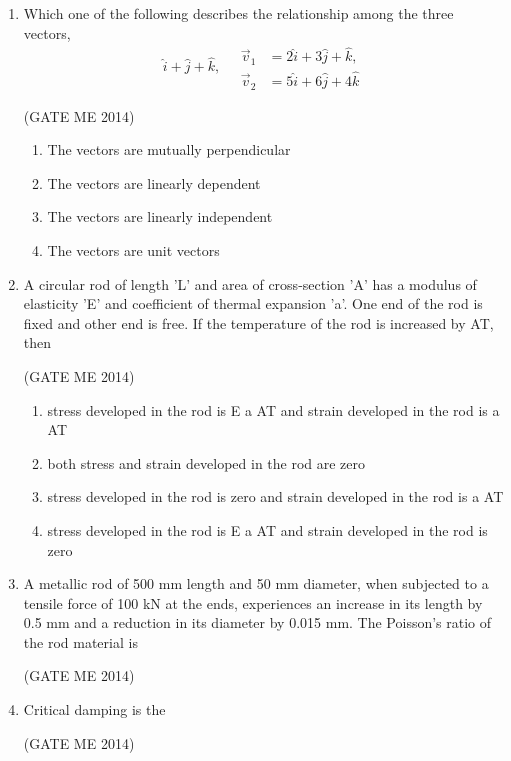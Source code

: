 \documentclass[journal]{IEEEtran}
\numberwithin{equation}{enumi}
\numberwithin{figure}{enumi}
\begin{document}
\begin{enumerate}
\item 
Which one of the following describes the relationship among the three vectors, 
\[
\hat{i} + \hat{j} + \hat{k}, \quad
\begin{aligned}
\vec{v}_1 &= 2\hat{i} + 3\hat{j} + \hat{k}, \\
\vec{v}_2 &= 5\hat{i} + 6\hat{j} + 4\hat{k}
\end{aligned}
\]

\hfill{(GATE ME 2014)}

\begin{enumerate}
    \item The vectors are mutually perpendicular
    \item The vectors are linearly dependent
    \item The vectors are linearly independent
    \item The vectors are unit vectors
\end{enumerate}
\item A circular rod of length 'L' and area of cross-section 'A' has a modulus of elasticity 'E' and
coefficient of thermal expansion 'a'. One end of the rod is fixed and other end is free. If the
temperature of the rod is increased by AT, then

\hfill{(GATE ME 2014)}

\begin{enumerate}
    
\item  stress developed in the rod is E a AT and strain developed in the rod is a AT
\item  both stress and strain developed in the rod are zero
\item  stress developed in the rod is zero and strain developed in the rod is a AT
\item  stress developed in the rod is E a AT and strain developed in the rod is zero

\end{enumerate}

\item A metallic rod of 500 mm length and 50 mm diameter, when subjected to a tensile force of 100 kN
at the ends, experiences an increase in its length by 0.5 mm and a reduction in its diameter by
0.015 mm. The Poisson's ratio of the rod material is

\hfill{(GATE ME 2014)}

\item 
Critical damping is the

\hfill{(GATE ME 2014)}


\end{enumerate}
\end{document}
